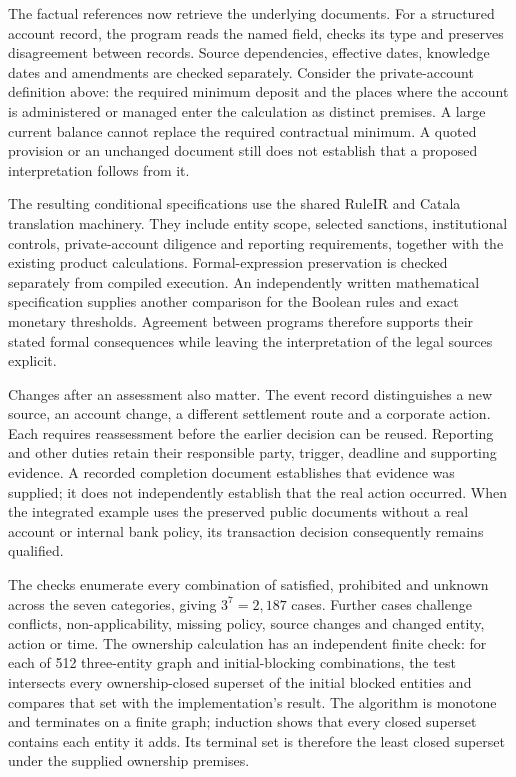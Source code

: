\documentclass[12pt,a4paper,oneside,openany]{book}
\begin{document}
The factual references now retrieve the underlying documents. For a structured
account record, the program reads the named field, checks its type and preserves
disagreement between records. Source dependencies, effective dates, knowledge
dates and amendments are checked separately. Consider the private-account
definition above: the required minimum deposit and the places where the account
is administered or managed enter the calculation as distinct premises. A large
current balance cannot replace the required contractual minimum. A quoted
provision or an unchanged document still does not establish that a proposed
interpretation follows from it.

The resulting conditional specifications use the shared RuleIR and Catala
translation machinery. They include entity scope, selected sanctions,
institutional controls, private-account diligence and reporting requirements,
together with the existing product calculations. Formal-expression preservation
is checked separately from compiled execution. An independently written
mathematical specification supplies another comparison for the Boolean rules
and exact monetary thresholds. Agreement between programs therefore supports
their stated formal consequences while leaving the interpretation of the legal
sources explicit.

Changes after an assessment also matter. The event record distinguishes a new
source, an account change, a different settlement route and a corporate action.
Each requires reassessment before the earlier decision can be reused. Reporting
and other duties retain their responsible party, trigger, deadline and supporting
evidence. A recorded completion document establishes that evidence was supplied;
it does not independently establish that the real action occurred. When the
integrated example uses the preserved public documents without a real account
or internal bank policy, its transaction decision consequently remains qualified.

The checks enumerate every combination of satisfied, prohibited and unknown
across the seven categories, giving $3^7=2{,}187$ cases. Further cases challenge
conflicts, non-applicability, missing policy, source changes and changed entity,
action or time. The ownership calculation has an independent finite check: for
each of 512 three-entity graph and initial-blocking combinations, the test
intersects every ownership-closed superset of the initial blocked entities and
compares that set with the implementation's result. The algorithm is monotone
and terminates on a finite graph; induction shows that every closed superset
contains each entity it adds. Its terminal set is therefore the least closed
superset under the supplied ownership premises.
\end{document}
